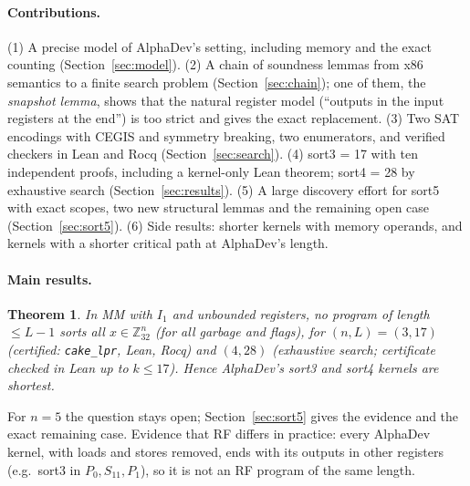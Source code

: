 \documentclass[11pt]{article}
\newtheorem{theorem}{Theorem}\newtheorem{lemma}[theorem]{Lemma}\newtheorem{corollary}[theorem]{Corollary}
\theoremstyle{remark}\newtheorem{remark}[theorem]{Remark}
\begin{document}
\paragraph{Contributions.}
(1) A precise model of AlphaDev's setting, including memory and the exact counting (Section~\ref{sec:model}).
(2) A chain of soundness lemmas from x86 semantics to a finite search problem (Section~\ref{sec:chain}); one of them, the
\emph{snapshot lemma}, shows that the natural register model (``outputs in the input registers at the end'') is too strict
and gives the exact replacement.
(3) Two SAT encodings with CEGIS and symmetry breaking, two enumerators, and verified checkers in Lean and Rocq
(Section~\ref{sec:search}).
(4) sort3 = 17 with ten independent proofs, including a kernel-only Lean theorem; sort4 = 28 by exhaustive search
(Section~\ref{sec:results}).
(5) A large discovery effort for sort5 with exact scopes, two new structural lemmas and the remaining open case
(Section~\ref{sec:sort5}).
(6) Side results: shorter kernels with memory operands, and kernels with a shorter critical path at AlphaDev's length.



\paragraph{Main results.}
\begin{theorem}\label{thm:main}
In MM with $I_1$ and unbounded registers, no program of length $\le L-1$ sorts all $x \in \mathbb{Z}_{32}^n$ (for all garbage
and flags), for $(n, L) = (3, 17)$ (certified: \texttt{cake\_lpr}, Lean, Rocq) and $(4, 28)$ (exhaustive search; certificate
checked in Lean up to $k \le 17$). Hence AlphaDev's sort3 and sort4 kernels are shortest.
\end{theorem}
For $n = 5$ the question stays open; Section~\ref{sec:sort5} gives the evidence and the exact remaining case.
Evidence that RF differs in practice: every AlphaDev kernel, with loads and stores removed, ends with its outputs in other
registers (e.g.\ sort3 in $P_0, S_{11}, P_1$), so it is not an RF program of the same length.
\end{document}
